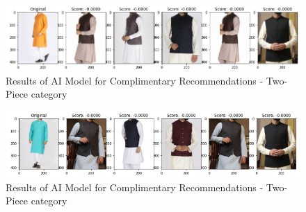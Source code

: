 \begin{figure}[H]
\includegraphics[width=12cm]{images/comp6.PNG} 
\centering
\caption{Results of AI Model for Complimentary Recommendations - Two-Piece category}
\label{architecture}
\end{figure}

\begin{figure}[H]
\includegraphics[width=12cm]{images/comp7.PNG} 
\centering
\caption{Results of AI Model for Complimentary Recommendations - Two-Piece category}
\label{architecture}
\end{figure}